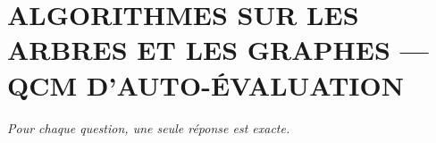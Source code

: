 
\section*{\textcolor{chapcolor}{\MakeUppercase{Algorithmes sur les arbres et les graphes — QCM d'auto-évaluation}}}

\begin{center}
\textit{Pour chaque question, une seule réponse est exacte.}
\end{center}

